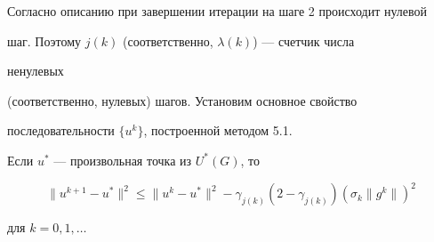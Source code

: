Согласно описанию при завершении итерации на шаге 2 происходит нулевой


шаг. Поэтому $j(k)$ (соответственно, $\lambda(k)$) --- счетчик числа


ненулевых


(соответственно, нулевых) шагов. Установим основное свойство


последовательности $\{u^k\}$, построенной методом 5.1.





\begin{lems}


Если $u^*$ --- произвольная точка из $U^*(G)$, то


\begin{equation}


\|u^{k+1}-u^*\|^2 \le \|u^k-u^*\|^2-\gamma_{j(k)}


(2-\gamma_{j(k)})(\sigma_k\|g^k\|)^2


\end{equation}


для $k=0,1,\dotsc$


\end{lems}





